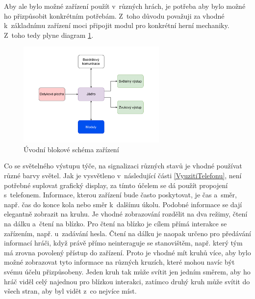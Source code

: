 Aby ale bylo možné zařízení použít v~různých hrách, je potřeba aby bylo možné ho přizpůsobit konkrétním potřebám.
Z~toho důvodu považuji za vhodné k~základnímu zařízení moci připojit modul pro konkrétní herní mechaniky.
Z~toho tedy plyne diagram \ref{fig:diagram_zanoreni_0}.
\begin{figure}[h]
    \centering
    \includegraphics[width=0.65\textwidth]{text/TeoretickyUvod/AplikaceHernichZarizeni/diagram/zanoreni_0.pdf}
    \caption{Úvodní blokové schéma zařízení}
    \label{fig:diagram_zanoreni_0}
\end{figure}

Co se světelného výstupu týče, na signalizaci různých stavů je vhodné používat různé barvy světel.
Jak je vysvětleno v~následující části \ref{VyuzitiTelefonu}, není potřebné suplovat grafický display, za tímto účelem se dá použít propojení s~telefonem.
Informace, kterou zařízení bude často poskytovat, je čas a~směr, např. čas do konce kola nebo směr k~dalšímu úkolu.
Podobné informace se dají elegantně zobrazit na kruhu.
Je vhodné zobrazování rozdělit na dva režimy, čtení na dálku a~čtení na blízko.
Pro čtení na blízko je cílem přímá interakce se zařízením, např. u~zadávání hesla.
Čtení na dálku je naopak určeno pro předávání informací hráči, když právě přímo neinteraguje se stanovištěm, např. který tým má zrovna povolený přístup do zařízení.
Proto je vhodné mít kruhů více, aby bylo možné zobrazovat tyto informace na různých kruzích, které mohou navíc být svému účelu přizpůsobeny.
Jeden kruh tak může svítit jen jedním směrem, aby ho hráč viděl celý najednou pro blízkou interakci, zatímco druhý kruh může svítit do všech stran, aby byl vidět z~co nejvíce míst.


